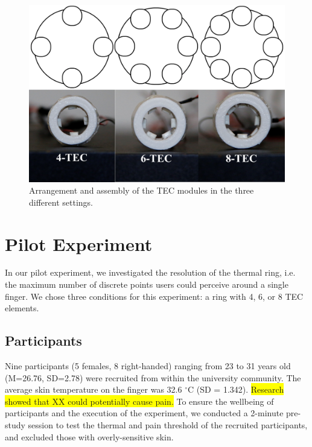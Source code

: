 \documentclass[preprint,12pt]{elsarticle}
\begin{document}
\begin{figure}[h]
  \centering
  \includegraphics[width=0.8\columnwidth]{img/fig4.png}
  \caption{Arrangement and assembly of the TEC modules in the three different settings.}
  \label{fig:4}
\end{figure}

\section{Pilot Experiment}
In our pilot experiment, we investigated the resolution of the thermal ring, i.e. the maximum number of discrete points users could perceive around a single finger. We chose three conditions for this experiment: a ring with 4, 6, or 8 TEC elements.

\subsection{Participants}
Nine participants (5 females, 8 right-handed) ranging from 23 to 31 years old (M=26.76, SD=2.78) were recruited from within the university community. The average skin temperature on the finger was 32.6 $^{\circ}$C (SD = 1.342). \colorbox{yellow}{Research showed that XX could potentially cause pain.} To ensure the wellbeing of participants and the execution of the experiment, we conducted a 2-minute pre-study session to test the thermal and pain threshold of the recruited participants, and excluded those with overly-sensitive skin.
\end{document}
